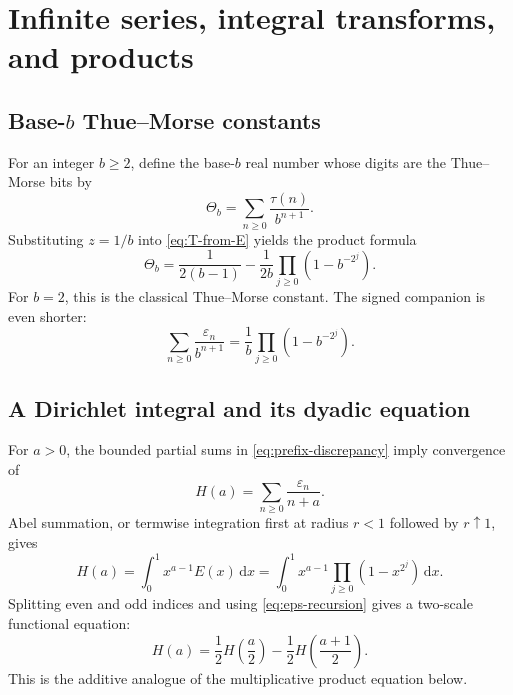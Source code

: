 \documentclass[11pt,oneside]{article}
\theoremstyle{definition}
\theoremstyle{remark}
\newcommand{\dd}{\,\mathrm d}
\newcommand{\eps}{\varepsilon}
\begin{document}
\section{Infinite series, integral transforms, and products}
\label{sec:infinite}

\subsection{Base-\(b\) Thue--Morse constants}

For an integer \(b\ge2\), define the base-\(b\) real number whose digits are
the Thue--Morse bits by
\begin{equation}
  \Theta_b=\sum_{n\ge0}\frac{\tau(n)}{b^{n+1}}.
  \label{eq:Theta-b-definition}
\end{equation}
Substituting \(z=1/b\) into \eqref{eq:T-from-E} yields the product formula
\begin{equation}
  \boxed{
  \Theta_b=\frac{1}{2(b-1)}
   -\frac{1}{2b}
    \prod_{j\ge0}\left(1-b^{-2^j}\right).}
  \label{eq:Theta-b-product}
\end{equation}
For \(b=2\), this is the classical Thue--Morse constant.  The signed companion
is even shorter:
\begin{equation}
  \sum_{n\ge0}\frac{\eps_n}{b^{n+1}}
  =\frac1b\prod_{j\ge0}\left(1-b^{-2^j}\right).
  \label{eq:signed-base-b}
\end{equation}

\subsection{A Dirichlet integral and its dyadic equation}

For \(a>0\), the bounded partial sums in
\eqref{eq:prefix-discrepancy} imply convergence of
\begin{equation}
  H(a)=\sum_{n\ge0}\frac{\eps_n}{n+a}.
  \label{eq:H-definition}
\end{equation}
Abel summation, or termwise integration first at radius \(r<1\) followed by
\(r\uparrow1\), gives
\begin{equation}
  H(a)=\int_0^1x^{a-1}E(x)\dd x
      =\int_0^1x^{a-1}
       \prod_{j\ge0}(1-x^{2^j})\dd x.
  \label{eq:H-integral}
\end{equation}
Splitting even and odd indices and using
\eqref{eq:eps-recursion} gives a two-scale functional equation:
\begin{equation}
  \boxed{
  H(a)=\frac12H\!\left(\frac a2\right)
       -\frac12H\!\left(\frac{a+1}{2}\right).}
  \label{eq:H-functional}
\end{equation}
This is the additive analogue of the multiplicative product equation below.
\end{document}
